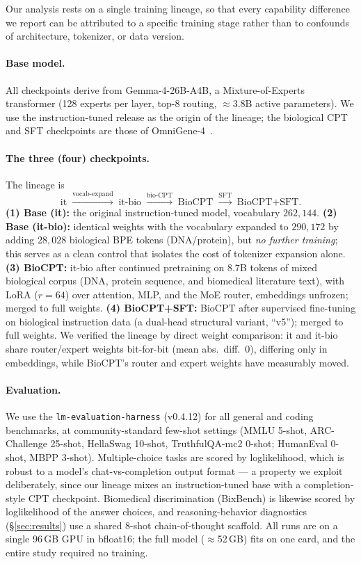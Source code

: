 
Our analysis rests on a single training lineage, so that every capability difference we
report can be attributed to a specific training stage rather than to confounds of architecture,
tokenizer, or data version.

\paragraph{Base model.} All checkpoints derive from Gemma-4-26B-A4B, a Mixture-of-Experts
transformer (128 experts per layer, top-8 routing, ${\approx}3.8$B active parameters). We use
the instruction-tuned release as the origin of the lineage; the biological CPT and SFT
checkpoints are those of OmniGene-4~\citep{wang2026omnigene}.

\paragraph{The three (four) checkpoints.} The lineage is
\[
\text{it} \;\xrightarrow{\text{vocab-expand}}\; \text{it-bio} \;\xrightarrow{\text{bio-CPT}}\;
\text{BioCPT} \;\xrightarrow{\text{SFT}}\; \text{BioCPT+SFT}.
\]
\textbf{(1) Base (it):} the original instruction-tuned model, vocabulary $262{,}144$.
\textbf{(2) Base (it-bio):} identical weights with the vocabulary expanded to $290{,}172$ by
adding $28{,}028$ biological BPE tokens (DNA/protein), but \emph{no further training}; this
serves as a clean control that isolates the cost of tokenizer expansion alone.
\textbf{(3) BioCPT:} it-bio after continued pretraining on $8.7$B tokens of mixed biological
corpus (DNA, protein sequence, and biomedical literature text), with LoRA ($r{=}64$) over
attention, MLP, and the MoE router, embeddings unfrozen; merged to full weights.
\textbf{(4) BioCPT+SFT:} BioCPT after supervised fine-tuning on biological instruction data
(a dual-head structural variant, ``v5''); merged to full weights.
We verified the lineage by direct weight comparison: it and it-bio share router/expert weights
bit-for-bit (mean abs.\ diff.\ $0$), differing only in embeddings, while BioCPT's router and
expert weights have measurably moved.

\paragraph{Evaluation.} We use the \texttt{lm-evaluation-harness} (v0.4.12) for all general and
coding benchmarks, at community-standard few-shot settings (MMLU 5-shot, ARC-Challenge 25-shot,
HellaSwag 10-shot, TruthfulQA-mc2 0-shot; HumanEval 0-shot, MBPP 3-shot). Multiple-choice tasks
are scored by loglikelihood, which is robust to a model's chat-vs-completion output format ---
a property we exploit deliberately, since our lineage mixes an instruction-tuned base with a
completion-style CPT checkpoint. Biomedical discrimination (BixBench) is likewise scored by
loglikelihood of the answer choices, and reasoning-behavior diagnostics (\S\ref{sec:results})
use a shared 8-shot chain-of-thought scaffold. All runs are on a single 96\,GB GPU in bfloat16;
the full model ($\approx$52\,GB) fits on one card, and the entire study required no training.

